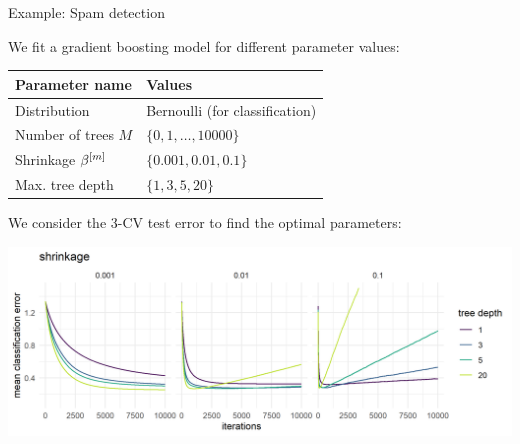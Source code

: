 \begin{vbframe}{Example: Spam detection}







%

We fit a gradient boosting model for different parameter values:

\begin{table}[]
\footnotesize
\centering
\begin{tabular}{l|l}
Parameter name      & Values                         \\
\hline
Distribution        & Bernoulli (for classification) \\
Number of trees $M$ & $\{0, 1,\dots,10000\}$              \\
Shrinkage $\beta^{[m]}$     & $\{0.001, 0.01, 0.1\}$           \\
Max. tree depth     & $\{1, 3, 5, 20\}$
\end{tabular}
\end{table}

\vfill
We consider the 3-CV test error to find the optimal parameters:




\begin{center}
\includegraphics[width=\textwidth]{figure/gbm_spam.png}
\end{center}


\end{vbframe}

